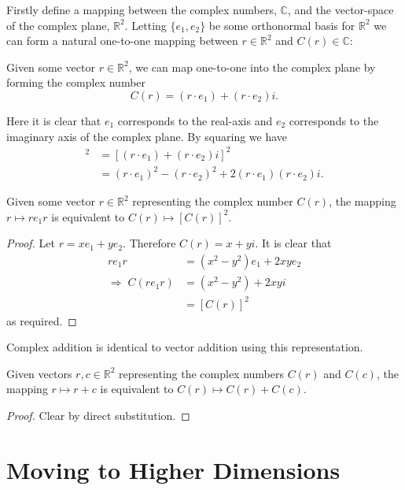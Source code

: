 Firstly define a mapping between the complex numbers, $\mathbb{C}$, and
the vector-space of the complex plane, $\mathbb{R}^2$. Letting $\{e_1, e_2\}$
be some orthonormal basis for $\mathbb{R}^2$ we can form a natural one-to-one
mapping between $r \in \mathbb{R}^2$ and $C(r) \in \mathbb{C}$:

\begin{definition}
Given some vector $r \in \mathbb{R}^2$, we can map one-to-one into the
complex plane by forming the complex number
\[
C(r) = (r \cdot e_1) + (r \cdot e_2)i.
\]
\end{definition}

Here it is clear that $e_1$ corresponds to the real-axis and $e_2$ 
corresponds to the imaginary axis of the complex plane.
By squaring we have
\begin{align*}
[C(r)]^2 &= [(r \cdot e_1) + (r \cdot e_2)i]^2 \\
       &= (r \cdot e_1)^2 - (r \cdot e_2)^2 + 2(r \cdot e_1)(r \cdot e_2)i.
\end{align*}

\begin{lemma}
Given some vector $r \in \mathbb{R}^2$ representing the complex number
$C(r)$, the mapping $r \mapsto re_1r$ is equivalent to $C(r) \mapsto [C(r)]^2$.
\end{lemma}
\begin{proof}
Let $r = xe_1 + ye_2$. Therefore $C(r) = x + yi$. It is clear that
\begin{align*}
re_1r &= (x^2 - y^2) e_1 + 2xye_2 \\
\Rightarrow\;C(re_1r) &= (x^2 - y^2) + 2xyi\\
        &= [C(r)]^2
\end{align*}
as required.
\end{proof}

Complex addition is identical to vector addition using this representation.
\begin{lemma}
Given vectors $r, c \in \mathbb{R}^2$ representing the complex numbers
$C(r)$ and $C(c)$, the mapping $r \mapsto r + c$ is equivalent to 
$C(r) \mapsto C(r) + C(c)$.
\end{lemma}
\begin{proof}
Clear by direct substitution.
\end{proof}

\section{Moving to Higher Dimensions}

